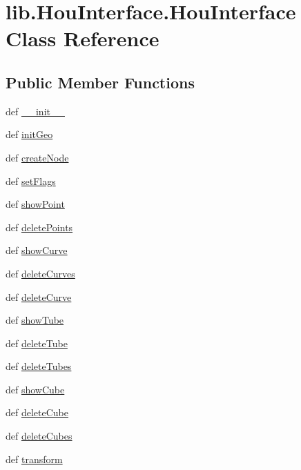 \hypertarget{classlib_1_1_hou_interface_1_1_hou_interface}{\section{lib.\-Hou\-Interface.\-Hou\-Interface Class Reference}
\label{classlib_1_1_hou_interface_1_1_hou_interface}
}
\subsection*{Public Member Functions}
\begin{DoxyCompactItemize}
\item 
def \hyperlink{classlib_1_1_hou_interface_1_1_hou_interface_a19fcfc7aaf73fc034595aef0181bbbf5}{\-\_\-\-\_\-init\-\_\-\-\_\-}
\item 
def \hyperlink{classlib_1_1_hou_interface_1_1_hou_interface_a615f5debf82cf3fe57564a349339a05f}{init\-Geo}
\item 
def \hyperlink{classlib_1_1_hou_interface_1_1_hou_interface_ab3293c7f8a148627b59f1ea59705ead2}{create\-Node}
\item 
def \hyperlink{classlib_1_1_hou_interface_1_1_hou_interface_a4a2f0d8b7d5b24ba083aa8db391de518}{set\-Flags}
\item 
def \hyperlink{classlib_1_1_hou_interface_1_1_hou_interface_a50a877efc052243dd04199cb33694190}{show\-Point}
\item 
def \hyperlink{classlib_1_1_hou_interface_1_1_hou_interface_a5d35a59c3d5ea1176c0516bb5dd837ef}{delete\-Points}
\item 
def \hyperlink{classlib_1_1_hou_interface_1_1_hou_interface_ae5ea212234c81f254e12b63f0c21c4e5}{show\-Curve}
\item 
def \hyperlink{classlib_1_1_hou_interface_1_1_hou_interface_ab46b1b23aca5729791dd658d5d2b5896}{delete\-Curves}
\item 
def \hyperlink{classlib_1_1_hou_interface_1_1_hou_interface_a93935b252491fc721506c24a65c96d60}{delete\-Curve}
\item 
def \hyperlink{classlib_1_1_hou_interface_1_1_hou_interface_a8976c8dd7c82cdf77e59a1e037a004fc}{show\-Tube}
\item 
def \hyperlink{classlib_1_1_hou_interface_1_1_hou_interface_a968febbf6110580c61bdf4b7494c964a}{delete\-Tube}
\item 
def \hyperlink{classlib_1_1_hou_interface_1_1_hou_interface_a6908abc9d4ae445a45291f6cd5c90a5c}{delete\-Tubes}
\item 
def \hyperlink{classlib_1_1_hou_interface_1_1_hou_interface_a1e39cd4fe8e130ddee44d027d1d09147}{show\-Cube}
\item 
def \hyperlink{classlib_1_1_hou_interface_1_1_hou_interface_a53f60feb155544ab043a0b9e5e20f12c}{delete\-Cube}
\item 
def \hyperlink{classlib_1_1_hou_interface_1_1_hou_interface_ae9c9137d656de362200bb99004a6399c}{delete\-Cubes}
\item 
def \hyperlink{classlib_1_1_hou_interface_1_1_hou_interface_a187256b6588ff329e202178e123328ca}{transform}
\end{DoxyCompactItemize}
